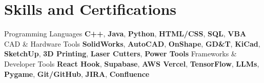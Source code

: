\section{Skills and Certifications}
    \resumeSubHeadingListStart
        \resumeSkillsHeading
            {Programming Languages}
            {\textbf{C++}, \textbf{Java}, \textbf{Python}, \textbf{HTML/CSS}, \textbf{SQL}, \textbf{VBA}}
        \resumeSkillsHeading
            {CAD \& Hardware Tools}
            {\textbf{SolidWorks}, \textbf{AutoCAD}, \textbf{OnShape}, \textbf{GD\&T}, \textbf{KiCad}, \textbf{SketchUp}, \textbf{3D Printing}, \textbf{Laser Cutters}, \textbf{Power Tools}}
        \resumeSkillsHeading
            {Frameworks \& Developer Tools}
            {\textbf{React Hook}, \textbf{Supabase}, \textbf{AWS Vercel}, \textbf{TensorFlow}, \textbf{LLMs}, \textbf{Pygame}, \textbf{Git/GitHub}, \textbf{JIRA}, \textbf{Confluence}}
    \resumeSubHeadingListEnd
    \vspace{-4pt}